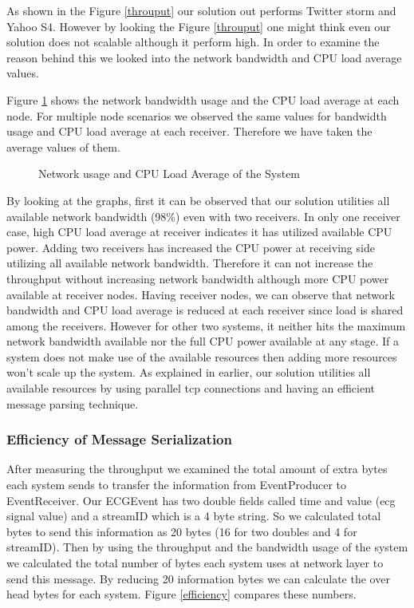 As shown in the Figure \ref{throuput} our solution out performs Twitter storm\cite{twitterStorm} and Yahoo S4\cite{neumeyer2010s4}. However by looking the Figure \ref{throuput} one might think even our solution does not scalable although it perform high. In order to examine the reason behind this we looked into the network bandwidth and CPU load average values. 
 
Figure \ref{networkandload} shows the network bandwidth usage and the CPU load average at each node. For multiple node scenarios we observed the same values for bandwidth usage and CPU load average at each receiver. Therefore we have taken the average values of them. 

\begin{figure}[!t]
	\centering
	\hfil
	\caption{Network usage and CPU Load Average of the System}
	\label{networkandload}
\end{figure}
 

By looking at the graphs, first it can be observed that our solution utilities all available network bandwidth (98\%) even with two receivers. In only one receiver case, high CPU load average at receiver indicates it has utilized available CPU power. Adding two receivers has increased the CPU power at receiving side utilizing all available network bandwidth. Therefore it can not increase the throughput without increasing network bandwidth although more CPU power available at receiver nodes. Having receiver nodes, we can observe that network bandwidth and CPU load average is reduced at each receiver since load is shared among the receivers. However for other two systems, it neither hits the maximum network bandwidth available nor the full CPU power available at any stage. If a system does not make use of the available resources then adding more resources won't scale up the system. As explained in earlier, our solution utilities all available resources by using parallel tcp connections and having an efficient 
message parsing technique.

\subsubsection{Efficiency of Message Serialization}
After measuring the throughput we examined the  total amount of extra bytes each system sends to transfer the information from EventProducer to EventReceiver. Our ECGEvent has two double fields called time and value (ecg signal value) and a streamID which is a 4 byte string. So we calculated total bytes to send this information as 20 bytes (16 for two doubles and 4 for streamID). Then by using the throughput and the bandwidth usage of the system we calculated the total number of bytes each system uses at network layer to send this message. By reducing 20 information bytes we can calculate the over head bytes for each system. Figure \ref{efficiency} compares these numbers.

